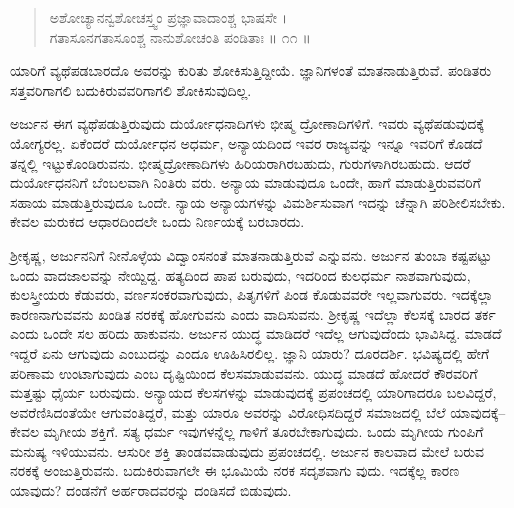 \begin{verse}
ಅಶೋಚ್ಯಾನನ್ವಶೋಚಸ್ತ್ವಂ ಪ್ರಜ್ಞಾವಾದಾಂಶ್ಚ ಭಾಷಸೇ ।\\ಗತಾಸೂನಗತಾಸೂಂಶ್ಚ ನಾನುಶೋಚಂತಿ ಪಂಡಿತಾಃ \num{॥ ೧೧ ॥}
\end{verse}

{\small ಯಾರಿಗೆ ವ್ಯಥೆಪಡಬಾರದೊ ಅವರನ್ನು ಕುರಿತು ಶೋಕಿಸುತ್ತಿದ್ದೀಯೆ. ಜ್ಞಾನಿಗಳಂತೆ ಮಾತನಾಡುತ್ತಿರುವೆ. ಪಂಡಿತರು ಸತ್ತವರಿಗಾಗಲಿ ಬದುಕಿರುವವರಿಗಾಗಲಿ ಶೋಕಿಸುವುದಿಲ್ಲ.}

ಅರ್ಜುನ ಈಗ ವ್ಯಥೆಪಡುತ್ತಿರುವುದು ದುರ್ಯೋಧನಾದಿಗಳು ಭೀಷ್ಮ ದ್ರೋಣಾದಿಗಳಿಗೆ. ಇವರು ವ್ಯಥೆಪಡುವುದಕ್ಕೆ ಯೋಗ್ಯರಲ್ಲ. ಏಕೆಂದರೆ ದುರ್ಯೋಧನ ಅಧರ್ಮ, ಅನ್ಯಾಯದಿಂದ ಇವರ ರಾಜ್ಯವನ್ನು ಇನ್ನೂ ಇವರಿಗೆ ಕೊಡದೆ ತನ್ನಲ್ಲಿ ಇಟ್ಟುಕೊಂಡಿರುವನು. ಭೀಷ್ಮದ್ರೋಣಾದಿಗಳು ಹಿರಿಯರಾಗಿರಬಹುದು, ಗುರುಗಳಾಗಿರಬಹುದು. ಆದರೆ ದುರ್ಯೋಧನನಿಗೆ ಬೆಂಬಲವಾಗಿ ನಿಂತಿರು ವರು. ಅನ್ಯಾಯ ಮಾಡುವುದೂ ಒಂದೇ, ಹಾಗೆ ಮಾಡುತ್ತಿರುವವರಿಗೆ ಸಹಾಯ ಮಾಡುತ್ತಿರುವುದೂ ಒಂದೇ. ನ್ಯಾಯ ಅನ್ಯಾಯಗಳನ್ನು ವಿಮರ್ಶಿಸುವಾಗ ಇದನ್ನು ಚೆನ್ನಾಗಿ ಪರಿಶೀಲಿಸಬೇಕು. ಕೇವಲ ಮರುಕದ ಆಧಾರದಿಂದಲೇ ಒಂದು ನಿರ್ಣಯಕ್ಕೆ ಬರಬಾರದು.

ಶ್ರೀಕೃಷ್ಣ, ಅರ್ಜುನನಿಗೆ ನೀನೊಳ್ಳೆಯ ವಿದ್ವಾಂಸನಂತೆ ಮಾತನಾಡುತ್ತಿರುವೆ ಎನ್ನುವನು. ಅರ್ಜುನ ತುಂಬಾ ಕಷ್ಟಪಟ್ಟು ಒಂದು ವಾದಜಾಲವನ್ನು ನೇಯ್ದಿದ್ದ. ಹತ್ಯದಿಂದ ಪಾಪ ಬರುವುದು, ಇದರಿಂದ ಕುಲಧರ್ಮ ನಾಶವಾಗುವುದು, ಕುಲಸ್ತ್ರೀಯರು ಕೆಡುವರು, ವರ್ಣಸಂಕರವಾಗುವುದು, ಪಿತೃಗಳಿಗೆ ಪಿಂಡ ಕೊಡುವವರೇ ಇಲ್ಲವಾಗುವರು. ಇದಕ್ಕೆಲ್ಲಾ ಕಾರಣನಾಗುವವನು ಖಂಡಿತ ನರಕಕ್ಕೆ ಹೋಗುವನು ಎಂದು ವಾದಿಸುವನು. ಶ್ರೀಕೃಷ್ಣ ಇದೆಲ್ಲಾ ಕೆಲಸಕ್ಕೆ ಬಾರದ ತರ್ಕ ಎಂದು ಒಂದೇ ಸಲ ಹರಿದು ಹಾಕುವನು. ಅರ್ಜುನ ಯುದ್ಧ ಮಾಡಿದರೆ ಇದೆಲ್ಲ ಆಗುವುದೆಂದು ಭಾವಿಸಿದ್ದ. ಮಾಡದೆ ಇದ್ದರೆ ಏನು ಆಗುವುದು ಎಂಬುದನ್ನು ಎಂದೂ ಊಹಿಸಿರಲಿಲ್ಲ. ಜ್ಞಾನಿ ಯಾರು? ದೂರದರ್ಶಿ. ಭವಿಷ್ಯದಲ್ಲಿ ಹೇಗೆ ಪರಿಣಾಮ ಉಂಟಾಗುವುದು ಎಂಬ ದೃಷ್ಟಿಯಿಂದ ಕೆಲಸಮಾಡುವವನು. ಯುದ್ಧ ಮಾಡದೆ ಹೋದರೆ ಕೌರವರಿಗೆ ಮತ್ತಷ್ಟು ಧೈರ್ಯ ಬರುವುದು. ಅನ್ಯಾಯದ ಕೆಲಸಗಳನ್ನು ಮಾಡುವುದಕ್ಕೆ ಪ್ರಪಂಚದಲ್ಲಿ ಯಾರಿಗಾದರೂ ಬಲವಿದ್ದರೆ, ಅವರೆಣಿಸಿದಂತೆಯೇ ಆಗುವಂತಿದ್ದರೆ, ಮತ್ತು ಯಾರೂ ಅವರನ್ನು ವಿರೋಧಿಸದಿದ್ದರೆ ಸಮಾಜದಲ್ಲಿ ಬೆಲೆ ಯಾವುದಕ್ಕೆ–ಕೇವಲ ಮೃಗೀಯ ಶಕ್ತಿಗೆ. ಸತ್ಯ ಧರ್ಮ ಇವುಗಳನ್ನೆಲ್ಲ ಗಾಳಿಗೆ ತೂರಬೇಕಾಗುವುದು. ಒಂದು ಮೃಗೀಯ ಗುಂಪಿಗೆ ಮನುಷ್ಯ ಇಳಿಯುವನು. ಆಸುರೀ ಶಕ್ತಿ ತಾಂಡವವಾಡುವುದು ಪ್ರಪಂಚದಲ್ಲಿ. ಅರ್ಜುನ ಕಾಲವಾದ ಮೇಲೆ ಬರುವ ನರಕಕ್ಕೆ ಅಂಜುತ್ತಿರುವನು. ಬದುಕಿರುವಾಗಲೇ ಈ ಭೂಮಿಯೆ ನರಕ ಸದೃಶವಾಗು ವುದು. ಇದಕ್ಕೆಲ್ಲ ಕಾರಣ ಯಾವುದು? ದಂಡನೆಗೆ ಅರ್ಹರಾದವರನ್ನು ದಂಡಿಸದೆ ಬಿಡುವುದು.

